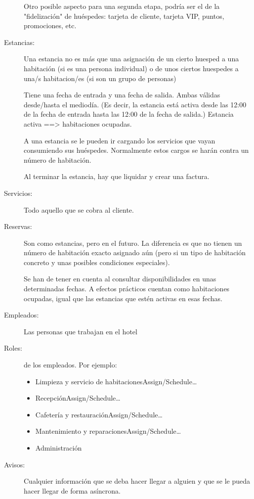 \documentclass[spanish,12pt,a4paper,final,oneside]{book}
\begin{document}
\begin{description}
Otro posible aspecto para una segunda etapa, podría ser el de la "fidelización" de huéspedes: tarjeta de cliente, tarjeta VIP, puntos, promociones, etc.

\item[Estancias:] Una estancia no es más que una asignación de un cierto huesped a una habitación (si es una persona individual) o de 
unos ciertos huespedes a una/s habitacion/es (si son un grupo de personas)

Tiene una fecha de entrada y una fecha de salida. Ambas válidas desde/hasta el mediodía. (Es decir, la estancia está activa desde las 12:00 de la fecha de entrada hasta las 12:00 de la fecha de salida.)
Estancia activa ==> habitaciones ocupadas.

A una estancia se le pueden ir cargando los servicios que vayan consumiendo sus huéspedes. Normalmente estos cargos se harán contra un número de habitación.

Al terminar la estancia, hay que liquidar y crear una factura.


\item[Servicios:] Todo aquello que se cobra al cliente.
 

\item[Reservas:] Son como estancias, pero en el futuro. La diferencia es que no tienen un número de habitación exacto asignado aún (pero si un tipo de habitación concreto y unas posibles condiciones especiales).

Se han de tener en cuenta al consultar disponibilidades en unas determinadas fechas. A efectos prácticos cuentan como habitaciones ocupadas, igual que las estancias que estén activas en esas fechas.

\item[Empleados:] Las personas que trabajan en el hotel

\item[Roles:] de los empleados.
Por ejemplo:
\begin{itemize}
\item Limpieza y servicio de habitacionesAssign/Schedule…
\item RecepciónAssign/Schedule…
\item Cafetería y restauraciónAssign/Schedule…
\item Mantenimiento y reparacionesAssign/Schedule…
\item Administración
\end{itemize}

\item[Avisos:] Cualquier información que se deba hacer llegar a alguien
y que se le pueda hacer llegar de forma asíncrona.

\end{description}
\end{document}
